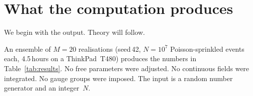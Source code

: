 \documentclass[aps,prd,twocolumn,superscriptaddress,nofootinbib,amsmath,amssymb,longbibliography]{revtex4-2}
\newcommand{\ds}{d_S}
\begin{document}
\begin{abstract}
the imaginary unit $i$ of quantum mechanics from causal geometry.
The Fisher information metric on the phase simplex yields a
2-sphere whose eigenmodes reproduce the atomic magic numbers
$2, 8, 18, 32$, covalent bond saturation at triple bonds,
and the octet rule---from pure topology with zero imposed parameters.
A multi-depth BD tensor analysis on the coarse-grained macro-graph
extracts a $4 \times 4$ emergent metric with Lorentzian signature
$(-\!+\!+\!+)$ in ${\sim}\,77\%$ of bulk nodes; the ratio of
temporal to spatial eigenvalues converges to
$G = 0.062 \approx 1/16$---the topological prefactor of the
Einstein--Hilbert action---stable across a seven-point
inscribed-diamond cutoff sweep ($\mathrm{CV} < 0.9$).
The spectral dimension flows from
$\ds(\sigma{=}1) = 1.949 \pm 0.002$ in the UV to
$\ds(\sigma{=}4) = 4.956 \pm 0.001$ in the IR.
Thirteen falsifiable predictions are enumerated.
\end{abstract}

\maketitle

\section{What the computation produces}\label{sec:results}

We begin with the output.  Theory will follow.

An ensemble of $M = 20$ realisations (seed\,42,
$N = 10^7$ Poisson-sprinkled events each,
4.5\,hours on a ThinkPad~T480) produces the numbers in
Table~\ref{tab:results}.
No free parameters were adjusted.  No continuous fields were integrated.
No gauge groups were imposed.
The input is a random number generator and an integer~$N$.
\end{document}
